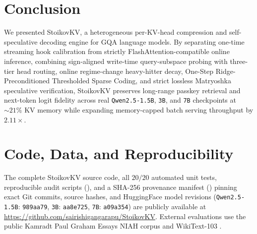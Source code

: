 \documentclass[conference]{IEEEtran}
\begin{document}
\section{Conclusion}
We presented StoikovKV, a heterogeneous per-KV-head compression and self-speculative decoding engine for GQA language models. By separating one-time streaming hook calibration from strictly FlashAttention-compatible online inference, combining sign-aligned write-time query-subspace probing with three-tier head routing, online regime-change heavy-hitter decay, One-Step Ridge-Preconditioned Thresholded Sparse Coding, and strict lossless Matryoshka speculative verification, StoikovKV preserves long-range passkey retrieval and next-token logit fidelity across real \texttt{Qwen2.5-1.5B}, \texttt{3B}, and \texttt{7B} checkpoints at $\sim 21\%$ KV memory while expanding memory-capped batch serving throughput by $2.11\times$.

\section*{Code, Data, and Reproducibility}
The complete StoikovKV source code, all $20/20$ automated unit tests, reproducible audit scripts (), and a SHA-256 provenance manifest () pinning exact Git commits, source hashes, and HuggingFace model revisions (\texttt{Qwen2.5-1.5B}: \texttt{989aa79}, \texttt{3B}: \texttt{aa8e725}, \texttt{7B}: \texttt{a09a354}) are publicly available at \url{https://github.com/sairishigangarapu/StoikovKV}. External evaluations use the public Kamradt Paul Graham Essays NIAH corpus \cite{b15} and WikiText-103 \cite{b16}.
\end{document}
